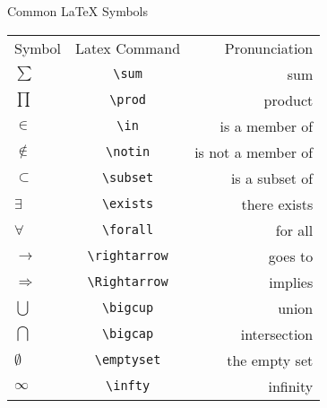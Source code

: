 \documentclass[10pt,a4paper]{article}
\begin{document}
\Huge
\begin{center}
Common {\LaTeX} Symbols
\end{center}



\Large

\begin{center}

\begin{tabular}{lcr}

Symbol & \hspace{10mm} Latex Command \hspace{10mm} & Pronunciation \vspace{.2in}\\  



\bf $\sum$ & \verb=\sum= & sum  \\ \hline 

\color{blue} $\prod$ & \color{blue} \verb=\prod= & \color{blue} product \\ \hline 

$\in$ & \verb=\in= & is a member of  \\ \hline

\color{blue} $\notin$ & \color{blue} \verb=\notin= & \color{blue} is not a member of  \\ \hline 

$\subset$ & \verb=\subset= & is a subset of  \\ \hline 

\color{blue} $\exists$ &\color{blue} \verb=\exists= &\color{blue} there exists  \\ \hline 

$\forall$ & \verb=\forall= & for all  \\ \hline 

\color{blue} $\rightarrow$ & \color{blue} \verb=\rightarrow= & \color{blue} goes to  \\ \hline 
 
$\Rightarrow$ & \verb=\Rightarrow= & implies \\ \hline 
 
\color{blue} $\bigcup$ & \color{blue} \verb=\bigcup= & \color{blue} union  \\ \hline 

$\bigcap$ & \verb=\bigcap= & intersection \\ \hline 

\color{blue} $\emptyset$ & \color{blue} \verb=\emptyset= & \color{blue} the empty set  \\ \hline 

$\infty$ & \verb=\infty= & infinity 



\end{tabular}



\end{center}
\end{document}
